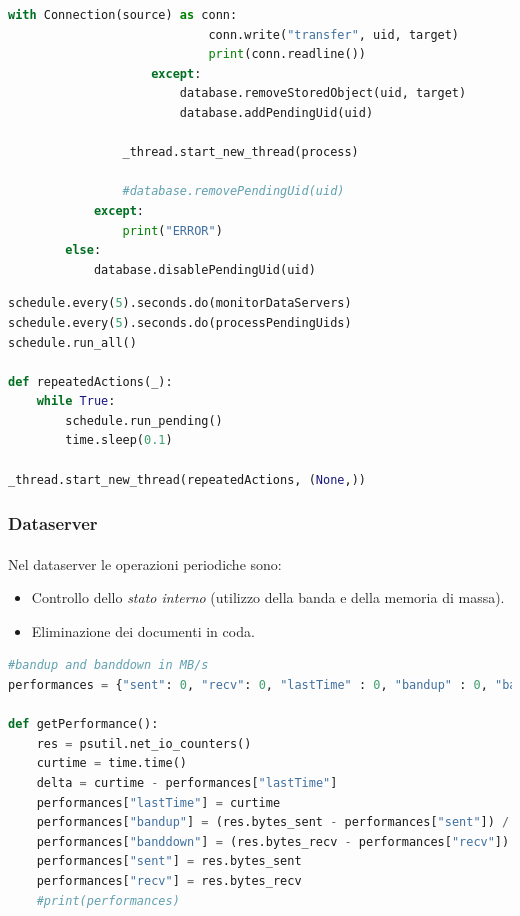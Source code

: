\documentclass[11pt,a4paper,english]{article}
\begin{document}
\begin{lstlisting}[language=Python, title=Mantenimento del grado di replicazione dei documenti]
                        with Connection(source) as conn:
                            conn.write("transfer", uid, target)
                            print(conn.readline())
                    except:
                        database.removeStoredObject(uid, target)
                        database.addPendingUid(uid)

                _thread.start_new_thread(process)

                #database.removePendingUid(uid)
            except:
                print("ERROR")
        else:
            database.disablePendingUid(uid)
\end{lstlisting}

\begin{lstlisting}[language=Python, title=Scheduling ed esecuzione]
schedule.every(5).seconds.do(monitorDataServers)
schedule.every(5).seconds.do(processPendingUids)
schedule.run_all()

def repeatedActions(_):
    while True:
        schedule.run_pending()
        time.sleep(0.1)

_thread.start_new_thread(repeatedActions, (None,))
\end{lstlisting}


\subsubsection{Dataserver}

\paragraph{} Nel dataserver le operazioni periodiche sono:\begin{itemize}
	\item Controllo dello \emph{stato interno} (utilizzo della banda e della memoria di massa).
	\item Eliminazione dei documenti in coda.
\end{itemize}


\begin{lstlisting}[language=Python, title=Controllo dello stato interno]
#bandup and banddown in MB/s
performances = {"sent": 0, "recv": 0, "lastTime" : 0, "bandup" : 0, "banddown" : 0}

def getPerformance():
    res = psutil.net_io_counters()
    curtime = time.time()
    delta = curtime - performances["lastTime"]
    performances["lastTime"] = curtime
    performances["bandup"] = (res.bytes_sent - performances["sent"]) / delta / 1000000
    performances["banddown"] = (res.bytes_recv - performances["recv"]) / delta / 1000000
    performances["sent"] = res.bytes_sent
    performances["recv"] = res.bytes_recv
    #print(performances)
\end{lstlisting}
\end{document}
